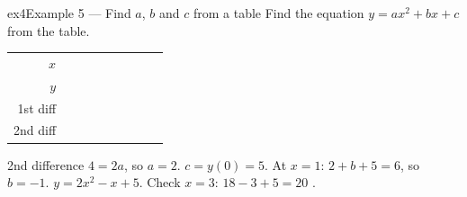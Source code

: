 \documentclass[11pt]{article}
\begin{document}
\begin{example}{ex4}{Example 5 --- Find $a$, $b$ and $c$ from a table}
Find the equation $y=ax^2+bx+c$ from the table.
\begin{center}\renewcommand{\arraystretch}{1.15}\setlength{\tabcolsep}{2pt}\begin{tabular}{r|>{\centering\arraybackslash}p{0.62cm}>{\centering\arraybackslash}p{0.62cm}>{\centering\arraybackslash}p{0.62cm}>{\centering\arraybackslash}p{0.62cm}>{\centering\arraybackslash}p{0.62cm}>{\centering\arraybackslash}p{0.62cm}>{\centering\arraybackslash}p{0.62cm}>{\centering\arraybackslash}p{0.62cm}}
$x$ & \multicolumn{2}{c}{\colorbox{iagreen}{\makebox[1.12cm]{\strut \color{white}\bfseries $0$}}} & \multicolumn{2}{c}{\colorbox{iagreen}{\makebox[1.12cm]{\strut \color{white}\bfseries $1$}}} & \multicolumn{2}{c}{\colorbox{iagreen}{\makebox[1.12cm]{\strut \color{white}\bfseries $2$}}} & \multicolumn{2}{c}{\colorbox{iagreen}{\makebox[1.12cm]{\strut \color{white}\bfseries $3$}}} \\[2pt]
$y$ & \multicolumn{2}{c}{\colorbox{keybg}{\makebox[1.12cm]{\strut $5$}}} & \multicolumn{2}{c}{\colorbox{keybg}{\makebox[1.12cm]{\strut $6$}}} & \multicolumn{2}{c}{\colorbox{keybg}{\makebox[1.12cm]{\strut $11$}}} & \multicolumn{2}{c}{\colorbox{keybg}{\makebox[1.12cm]{\strut $20$}}} \\[2pt]
\textcolor{exblue}{\scriptsize 1st diff} & & \multicolumn{2}{c}{\colorbox{exbg}{\makebox[1.12cm]{\strut \textcolor{exblue}{$+1$}}}} & \multicolumn{2}{c}{\colorbox{exbg}{\makebox[1.12cm]{\strut \textcolor{exblue}{$+5$}}}} & \multicolumn{2}{c}{\colorbox{exbg}{\makebox[1.12cm]{\strut \textcolor{exblue}{$+9$}}}} & \\[2pt]
\textcolor{qorange}{\scriptsize 2nd diff} & & & \multicolumn{2}{c}{\colorbox{qbg}{\makebox[1.12cm]{\strut \textcolor{qorange!70!black}{$+4$}}}} & \multicolumn{2}{c}{\colorbox{qbg}{\makebox[1.12cm]{\strut \textcolor{qorange!70!black}{$+4$}}}} & & \\
\end{tabular}\end{center}
\soln 2nd difference $4=2a$, so $a=2$. $c=y(0)=5$. At $x=1$: $2+b+5=6$, so $b=-1$. $y=2x^2-x+5$. Check $x=3$: $18-3+5=20$ \checkmark.
\end{example}
\end{document}
